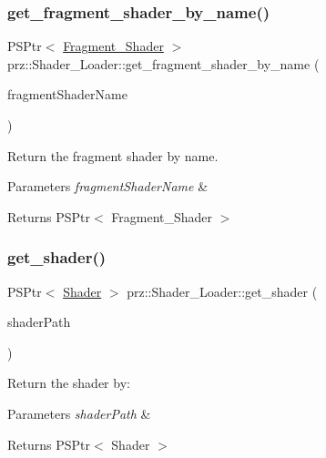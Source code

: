 \subsubsection{\texorpdfstring{get\_fragment\_shader\_by\_name()}{get\_fragment\_shader\_by\_name()}}
{\footnotesize\ttfamily P\+S\+Ptr$<$ \mbox{\hyperlink{classprz_1_1_fragment___shader}{Fragment\+\_\+\+Shader}} $>$ prz\+::\+Shader\+\_\+\+Loader\+::get\+\_\+fragment\+\_\+shader\+\_\+by\+\_\+name (\begin{DoxyParamCaption}\item[{const P\+String \&}]{fragment\+Shader\+Name }\end{DoxyParamCaption})\hspace{0.3cm}{\ttfamily [inline]}}



Return the fragment shader by name. 


\begin{DoxyParams}{Parameters}
{\em fragment\+Shader\+Name} & \\
\hline
\end{DoxyParams}
\begin{DoxyReturn}{Returns}
P\+S\+Ptr$<$ Fragment\+\_\+\+Shader $>$ 
\end{DoxyReturn}
\mbox{\label{classprz_1_1_shader___loader_a4e23aa9732cbb8ee6f77fe44c6bf58fe}} 
\subsubsection{\texorpdfstring{get\_shader()}{get\_shader()}}
{\footnotesize\ttfamily P\+S\+Ptr$<$ \mbox{\hyperlink{classprz_1_1_shader}{Shader}} $>$ prz\+::\+Shader\+\_\+\+Loader\+::get\+\_\+shader (\begin{DoxyParamCaption}\item[{const P\+String \&}]{shader\+Path }\end{DoxyParamCaption})\hspace{0.3cm}{\ttfamily [inline]}}



Return the shader by\+: 


\begin{DoxyParams}{Parameters}
{\em shader\+Path} & \\
\hline
\end{DoxyParams}
\begin{DoxyReturn}{Returns}
P\+S\+Ptr$<$ Shader $>$ 
\end{DoxyReturn}
\mbox{\label{classprz_1_1_shader___loader_a4b30fda72b2a2d19fe0b1af223dc9264}} 
